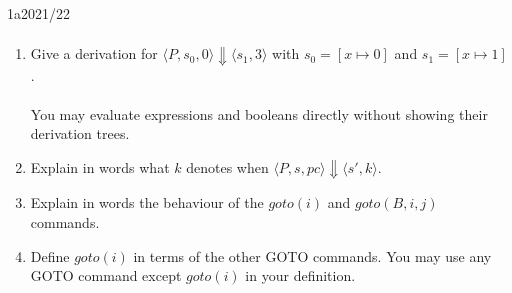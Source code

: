 \begin{exambox}{1a}{2021/22}
\[\begin{split}
	\end{split}\]
	\begin{enumerate}[label=\roman*)]
		\item {Give a derivation for $\langle P, s_0, 0 \rangle \Downarrow \langle s_1, 3 \rangle$ with $s_0 = [x \mapsto 0]$ and $s_1 = [x \mapsto 1]$.
		\\
		\\ You may evaluate expressions and booleans directly without showing their derivation trees.}
		\item Explain in words what $k$ denotes when $\langle P, s, pc \rangle \Downarrow \langle s', k \rangle$.
		\item Explain in words the behaviour of the $goto(i)$ and $goto(B, i, j)$ commands. 
		\item Define $goto(i)$ in terms of the other GOTO commands. You may use any GOTO command except $goto(i)$ in your definition.
	\end{enumerate}
\end{exambox}
